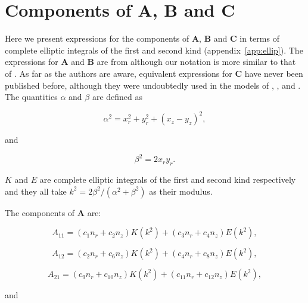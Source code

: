 \documentclass[12pt]{article}
\begin{document}
\section{Components of $\boldsymbol{A}$, $\boldsymbol{B}$ and $\boldsymbol{C}$}
\label{app:mat_A}

Here we present expressions for the components of $\boldsymbol{A}$, $\boldsymbol{B}$ and $\boldsymbol{C}$ in terms of complete elliptic integrals of the first and second kind (appendix~\ref{app:ellip}). The expressions for $\boldsymbol{A}$ and $\boldsymbol{B}$ are from \citet{Graziani89} although our notation is more similar to that of \citet{Manga94}. As far as the authors are aware, equivalent expressions for $\boldsymbol{C}$ have never been published before, although they were undoubtedly used in the models of \citet{Lee82}, \citet{Geller86}, \citet{Manga95} and \citet{Roumeliotis00}. The quantities $\alpha$ and $\beta$ are defined as \citep{Manga94}

\begin{equation}
\label{equ:alpha_def}
\alpha^{2} = x_{r}^{2} + y_{r}^{2} + (x_{z} - y_{z})^{2},
\end{equation}

and 

\begin{equation}
\label{equ:beta_def}
\beta^{2} = 2 x_{r} y_{r}.
\end{equation}


$K$ and $E$ are complete elliptic integrals of the first and second kind respectively and they all take $k^{2} = 2 \beta^{2} / (\alpha^{2} + \beta^{2})$ as their modulus. 

The components of $\boldsymbol{A}$ are:

\begin{equation}
\label{equ:A11_comp}
A_{11} = (c_{1} n_{r} + c_{2} n_{z})K(k^{2}) + (c_{3} n_{r} + c_{4} n_{z})E(k^{2}),
\end{equation}

\begin{equation}
\label{equ:A12_comp}
A_{12} = (c_{2} n_{r} + c_{6} n_{z})K(k^{2}) + (c_{4} n_{r} + c_{8} n_{z})E(k^{2}),
\end{equation}

\begin{equation}
\label{equ:A21_comp}
A_{21} = (c_{9} n_{r} + c_{10} n_{z})K(k^{2}) + (c_{11} n_{r} + c_{12} n_{z})E(k^{2}),
\end{equation}

and 
\end{document}
